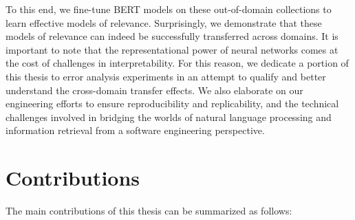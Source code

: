To this end, we fine-tune BERT models on these out-of-domain collections to learn effective models of relevance.
Surprisingly, we demonstrate that these models of relevance can indeed be successfully transferred across domains.
It is important to note that the representational power of neural networks comes at the cost of challenges in interpretability.
For this reason, we dedicate a portion of this thesis to error analysis experiments in an attempt to qualify and better understand the cross-domain transfer effects.
We also elaborate on our engineering efforts to ensure reproducibility and replicability, and the technical challenges involved in bridging the worlds of natural language processing and information retrieval from a software engineering perspective.

\newpage

\section{Contributions}

The main contributions of this thesis can be summarized as follows:\\

